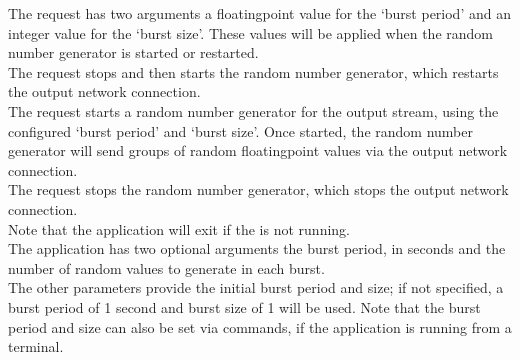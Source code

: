 The  request has two arguments
\longDash{} a floating\longDash{}point value for the `burst period' and an integer value
for the `burst size'.
These values will be applied when the random number generator is started or restarted.\\

The  request stops and then
starts the random number generator, which restarts the output \yarp{} network
connection.\\

The  request starts a random
number generator for the output stream, using the configured `burst period' and
`burst size'.
Once started, the random number generator will send groups of random
floating\longDash{}point values via the output \yarp{} network connection.\\

The  request stops the random
number generator, which stops the output \yarp{} network connection.\\ 

Note that the application will exit if the
 is not running.\\

The application has two optional arguments \longDash{} the burst period, in seconds and
the number of random values to generate in each burst.
\insertAppParameters{}
\insertInputServiceComment{}\\

The other parameters provide the initial burst period and size; if not specified, a burst
period of 1 second and burst size of 1 will be used.
Note that the burst period and size can also be set via commands, if the application is
running from a terminal.\\

